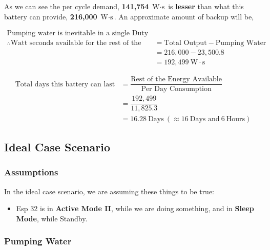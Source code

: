 \documentclass[../main.tex]{subfiles}
\begin{document}
As we can see the per cycle demand, \textbf{141,754} $\mbox{W} \cdot \mbox{s}$
is \textbf{lesser} than what this battery can provide, \textbf{216,000}
$\mbox{W} \cdot \mbox{s}$. An approximate amount of backup will be,

\begin{align*}
    \mbox{Pumping water is inevitable in a single Duty Cycle.} \\
    \therefore \mbox{Watt seconds available for the rest of the Cycle} &= \mbox{Total Output} - \mbox{Pumping Water} \\
    &= 216,000 - 23,500.8 \\
    &= 192,499 \: \mbox{W} \cdot \mbox{s}
\end{align*}

\begin{align*}
    \mbox{Total days this battery can last} &= \dfrac{\mbox{Rest of the Energy Available}}{\mbox{Per Day Consumption}} \\
    &= \dfrac{192,499}{11,825.3} \\
    &= 16.28 \: \mbox{Days} \: (\approx 16 \: \mbox{Days and} \: 6 \: \mbox{Hours})
\end{align*}


\subsection{Ideal Case Scenario}

\subsubsection{Assumptions}

In the ideal case scenario, we are assuming these things to be true:

\begin{itemize}
    \item Esp 32 is in \textbf{Active Mode II}, while we are doing something, and in \textbf{Sleep Mode}, while Standby.
\end{itemize}

\subsubsection{Pumping Water}
\end{document}
